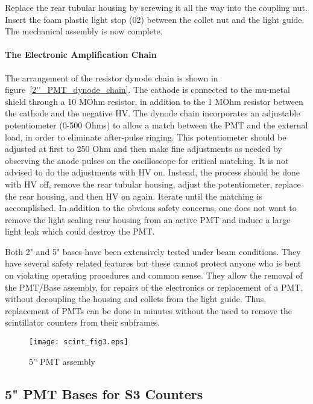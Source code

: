 \documentclass[12pt]{article}
\begin{document}
Replace the rear tubular housing by screwing it all the way into the coupling 
nut. Insert the foam plastic light stop (02) between the collet nut and the 
light guide. The mechanical assembly is now complete. 


\paragraph{The Electronic Amplification Chain}

   The arrangement of the resistor dynode chain is shown in figure~\ref{2''_PMT_dynode_chain}. The 
cathode is connected to the mu-metal shield through a 10 MOhm resistor, in
addition to the 1 MOhm resistor between the cathode and the negative HV. The
dynode chain incorporates an adjustable potentiometer (0-500 Ohms) to allow a
match between the PMT and the external load, in order to eliminate after-pulse
ringing.  This potentiometer should be adjusted at first to 250 Ohm and then
make fine adjustments as needed by observing the anode pulses on the
oscilloscope for critical matching. It is not advised to do the adjustments
with HV on. Instead, the process should be done with HV off, remove the rear
tubular housing, adjust the potentiometer, replace the rear housing, and then
HV on again. Iterate until the matching is accomplished. In addition to the
obvious safety concerns, one does not want to remove the light sealing rear
housing from an active PMT and induce a large light leak which could destroy
the PMT. 

   Both 2" and 5" bases have been extensively tested under beam conditions. 
They have several safety related features but these cannot protect anyone who 
is bent on violating operating procedures and common sense. They allow the 
removal of the PMT/Base assembly, for repairs of the electronics or replacement 
of a PMT, without decoupling the housing and collets from the light guide. 
Thus, replacement of PMTs can be done in minutes without the need to remove the 
scintillator counters from their subframes.

\begin{figure}
\begin{center}
\texttt{[image: scint\_fig3.eps]}
{\linespread{1.}
\caption[The S3 trigger scintillators]{5'' PMT assembly}
\label{5''_PMT_assembly}}
\end{center}
\end{figure}

\subsection{ 5" PMT Bases for S3 Counters}
\end{document}

